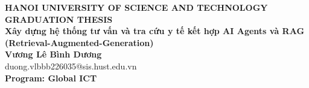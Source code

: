 \documentclass[main.tex]{subfiles}
\begin{document}
\begin{titlepage}
\thispagestyle{empty}
\begin{center}

{\textbf{\large{HANOI UNIVERSITY OF SCIENCE AND TECHNOLOGY }}}\\[4cm]

{\textbf{\huge{GRADUATION THESIS}}}\\[1cm]
{\textbf{\Large{Xây dựng hệ thống tư vấn và tra cứu y tế kết hợp AI Agents và RAG (Retrieval-Augmented-Generation)}}}\\[1cm]

{\textbf{\large{Vương Lê Bình Dương}}}\\
{\large{duong.vlbbb226035@sis.hust.edu.vn}}\\[0.5cm]

{\textbf{\large{Program: Global ICT}}}\\

\vspace{4cm}
\begin{table}[H]
\centering
{}
\end{table}
\end{center}



\end{titlepage}
\end{document}
